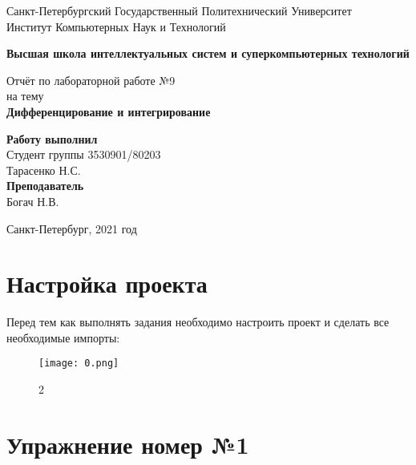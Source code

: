 \documentclass[10pt,a4paper,oneside]{article}
\begin{document}
\begin{titlepage}
\newpage
	\begin{center}
		\Large Санкт-Петербургский Государственный Политехнический Университет\\
		Институт Компьютерных Наук и Технологий\\
	\end{center}
	\begin{center}
		\large\textbf {Высшая школа интеллектуальных систем и суперкомпьютерных технологий}
	\end{center}
	
	\vspace{5em}
	\begin{center}
		\large{Отчёт по лабораторной работе №9 \\ на тему \\
		\textbf{Дифференцирование и интегрирование} }
	\end{center}
	
	\vspace{25em}
	\begin{flushright}
		\textbf{Работу выполнил\\}Студент группы 3530901/80203 \\ Тарасенко Н.С.\\
		\textbf{Преподаватель\\}Богач Н.В. 
	\end{flushright}
	
	\vspace{\fill}%
	\begin{center}
	Санкт-Петербург, 2021 год	
	\end{center}
\end{titlepage} %

\section{Настройка проекта}
Перед тем как выполнять задания необходимо настроить проект и сделать все необходимые импорты:

\begin{figure}[H]
        \centering
        \texttt{[image: 0.png]}
        \caption{2}
        \label{fig:first}
\end{figure}

\section{Упражнение номер №1}
\end{document}
